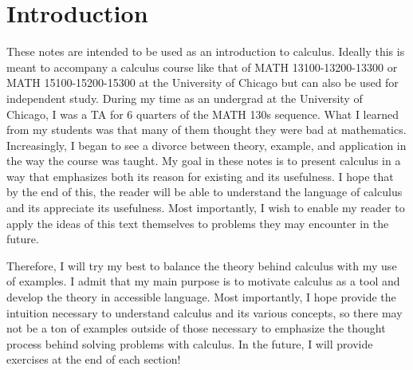 \maketitle


\section*{\hfill Introduction \hfill}

These notes are intended to be used as an introduction to calculus. Ideally this is meant to accompany a calculus course like that of MATH 13100-13200-13300 or MATH 15100-15200-15300 at the University of Chicago but can also be used for independent study. During my time as an undergrad at the University of Chicago, I was a TA for 6 quarters of the MATH 130s sequence. What I learned from my students was that many of them thought they were bad at mathematics. Increasingly, I began to see a divorce between theory, example, and application in the way the course was taught. My goal in these notes is to present calculus in a way that emphasizes both its reason for existing and its usefulness. I hope that by the end of this, the reader will be able to understand the language of calculus and its appreciate its usefulness. Most importantly, I wish to enable my reader to apply the ideas of this text themselves to problems they may encounter in the future.

Therefore, I will try my best to balance the theory behind calculus with my use of examples. I admit that my main purpose is to motivate calculus as a tool and develop the theory in accessible language. Most importantly, I hope provide the intuition necessary to understand calculus and its various concepts, so there may not be a ton of examples outside of those necessary to emphasize the thought process behind solving problems with calculus. In the future, I will provide exercises at the end of each section!


\thispagestyle{empty}

\newpage
\tableofcontents
\thispagestyle{empty}
\newpage

\setcounter{page}{1}

